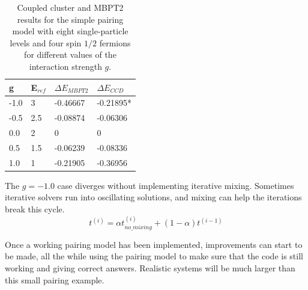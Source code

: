 \begin{table}
\caption{Coupled cluster and MBPT2 results for the simple pairing model with eight single-particle levels and four spin $1/2$ fermions
for different values of the interaction strength $g$.} \label{tab:selectedbenchmarks}
  \begin{center}
      \begin{tabular}{| l | l | l | l |}
      \hline g & E$_{ref}$ & $\Delta E_{MBPT2}$ & $\Delta E_{CCD}$
      \\ \hline -1.0 & 3 & -0.46667 & -0.21895* \\ \hline -0.5 & 2.5 &
      -0.08874 & -0.06306 \\ \hline 0.0 & 2 & 0 & 0 \\ \hline 0.5 &
      1.5 & -0.06239 & -0.08336 \\ \hline 1.0 & 1 & -0.21905 &
      -0.36956 \\ \hline
      \end{tabular}
  \end{center}
\end{table}
  The $g=-1.0$ case diverges without implementing iterative
  mixing. Sometimes iterative solvers run into oscillating solutions,
  and mixing can help the iterations break this cycle.
  \begin{equation}
  t^{(i)} = \alpha t^{(i)}_{no\_mixing} + (1 - \alpha) t^{(i-1)}
  \end{equation}




  Once a working pairing model has been implemented, improvements can
  start to be made, all the while using the pairing model to make sure
  that the code is still working and giving correct answers. Realistic
  systems will be much larger than this small pairing example.

